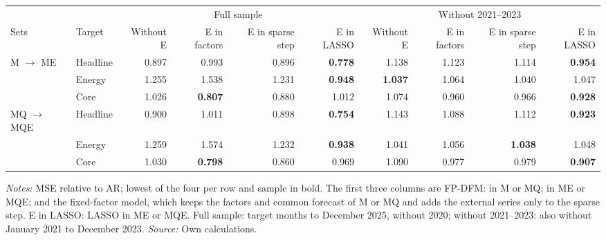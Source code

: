 \begin{threeparttable}
\begin{tabular}{@{}llrrrrrrrr@{}}
\toprule
\multicolumn{2}{c}{} & \multicolumn{4}{c}{Full sample} & \multicolumn{4}{c}{Without 2021--2023} \\
\cmidrule(lr){3-6} \cmidrule(lr){7-10}
Sets & Target & Without E & E in factors & E in sparse step & E in LASSO & Without E & E in factors & E in sparse step & E in LASSO \\
\midrule
M $\to$ ME & Headline & 0.897 & 0.993 & 0.896 & \textbf{0.778} & 1.138 & 1.123 & 1.114 & \textbf{0.954} \\
 & Energy & 1.255 & 1.538 & 1.231 & \textbf{0.948} & \textbf{1.037} & 1.064 & 1.040 & 1.047 \\
 & Core & 1.026 & \textbf{0.807} & 0.880 & 1.012 & 1.074 & 0.960 & 0.966 & \textbf{0.928} \\
\midrule
MQ $\to$ MQE & Headline & 0.900 & 1.011 & 0.898 & \textbf{0.754} & 1.143 & 1.088 & 1.112 & \textbf{0.923} \\
 & Energy & 1.259 & 1.574 & 1.232 & \textbf{0.938} & 1.041 & 1.056 & \textbf{1.038} & 1.048 \\
 & Core & 1.030 & \textbf{0.798} & 0.860 & 0.969 & 1.090 & 0.977 & 0.979 & \textbf{0.907} \\
\bottomrule
\end{tabular}
\begin{tablenotes}[flushleft]\footnotesize
\item \textit{Notes:} MSE relative to AR; lowest of the four per row and sample in bold. The first three columns are FP-DFM: in M or MQ; in ME or MQE; and the fixed-factor model, which keeps the factors and common forecast of M or MQ and adds the external series only to the sparse step. E in LASSO: LASSO in ME or MQE. Full sample: target months to December 2025, without 2020; without 2021--2023: also without January 2021 to December 2023. \textit{Source:} Own calculations.
\end{tablenotes}
\end{threeparttable}
